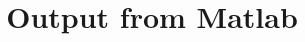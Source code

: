 \documentclass[12pt,letter]{article}
\begin{document}
\title{Output from Matlab}
\maketitle 
\end{document}
